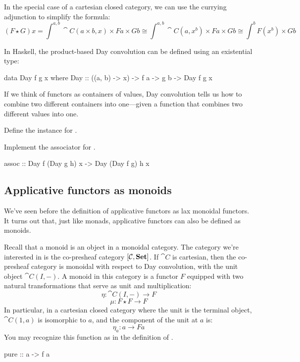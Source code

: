 \documentclass[DaoFP]{subfiles}
\begin{document}
In the special case of a cartesian closed category, we can use the currying adjunction to simplify the formula:
\[ (F \star G) x = \int^{a, b} \cat C (a \times b, x) \times F a \times G b \cong  \int^{a, b} \cat C (a, x^b) \times F a \times G b \cong  \int^{b}  F (x^b) \times G b\]

In Haskell, the product-based Day convolution can be defined using an existential type:
\begin{haskell}
data Day f g x where
  Day :: ((a, b) -> x) -> f a -> g b -> Day f g x
\end{haskell}

If we think of functors as containers of values, Day convolution tells us how to combine two different containers into one---given a function that combines two different values into one. 

\begin{exercise}
Define the  instance for .
\end{exercise}

\begin{exercise}
Implement the associator for .
\begin{haskell}
assoc :: Day f (Day g h) x -> Day (Day f g) h x
\end{haskell}
\end{exercise}


\subsection{Applicative functors as monoids}
 
 We've seen before the definition of applicative functors as lax monoidal functors. It turns out that, just like monads, applicative functors can also be defined as monoids. 
 
Recall that a monoid is an object in a monoidal category. The category we're interested in is the co-presheaf category $[\mathcal{C}, \mathbf{Set}]$. If $\cat C$ is cartesian, then the co-presheaf category is monoidal with respect to Day convolution, with the unit object $\cat C(I, -)$. A monoid in this category is a functor $F$ equipped with two natural transformations that serve as unit and multiplication:
\[ \eta \colon \cat C(I, -) \to F \]
\[ \mu \colon F \star F \to F \]
In particular, in a cartesian closed category where the unit is the terminal object, $\cat C(1, a)$ is isomorphic to $a$, and the component of the unit at $a$ is:
\[ \eta_a \colon a \to F a \] 
You may recognize this function as  in the definition of .
\begin{haskell}
pure :: a -> f a
\end{haskell}
\end{document}
